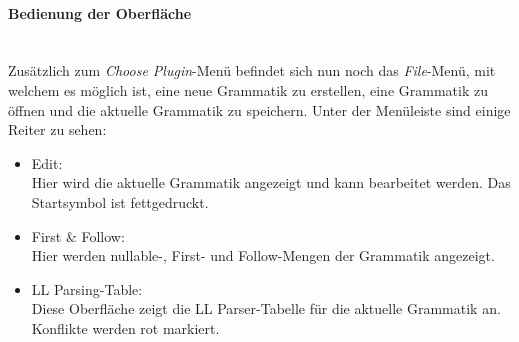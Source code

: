 \paragraph{Bedienung der Oberfläche}\ \\
Zusätzlich zum \textit{Choose Plugin}-Menü befindet sich nun noch das \textit{File}-Menü, mit welchem es möglich ist, eine neue Grammatik zu erstellen, eine Grammatik zu öffnen und die aktuelle Grammatik zu speichern.
Unter der Menüleiste sind einige Reiter zu sehen:\\
\begin{itemize}
	\item Edit:\\
	Hier wird die aktuelle Grammatik angezeigt und kann bearbeitet werden. Das Startsymbol ist fettgedruckt.
	\item First \& Follow:\\
	Hier werden nullable-, First- und Follow-Mengen der Grammatik angezeigt.
	\item LL Parsing-Table:\\
	Diese Oberfläche zeigt die LL Parser-Tabelle für die aktuelle Grammatik an. Konflikte werden rot markiert.
\end{itemize}
